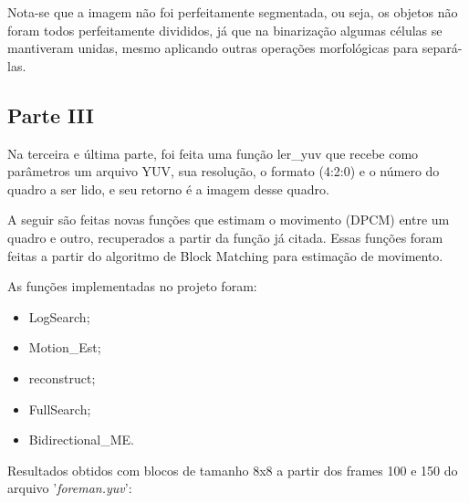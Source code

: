 \documentclass[journal]{IEEEtran}
\begin{document}
Nota-se que a imagem não foi perfeitamente segmentada, ou seja, os objetos não foram todos perfeitamente divididos, já que na binarização algumas células se mantiveram unidas, mesmo aplicando outras operações morfológicas para separá-las.

\subsection{Parte III}
Na terceira e última parte, foi feita uma função ler\_yuv que recebe como parâmetros um arquivo YUV, sua resolução, o formato (4:2:0) e o número do quadro a ser lido, e seu retorno é a imagem desse quadro.

A seguir são feitas novas funções que estimam o movimento (DPCM) entre um quadro e outro, recuperados a partir da função já citada. Essas funções foram feitas a partir do algoritmo de Block Matching para estimação de movimento.

As funções implementadas no projeto foram:

\begin{itemize}
	\item LogSearch;
	\item Motion\_Est;
	\item reconstruct;
	\item FullSearch;
	\item Bidirectional\_ME.
\end{itemize}

Resultados obtidos com blocos de tamanho 8x8 a partir dos frames 100 e 150 do arquivo '\textit{foreman.yuv}':
\end{document}
